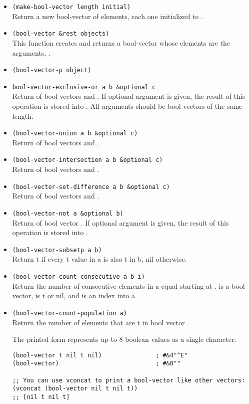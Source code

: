 \begin{itemize}
\item \lstinline|(make-bool-vector length initial)|\\
  Return a new bool-vector of  elements, each one initialized to .
\item \lstinline|(bool-vector &rest objects)|\\
  This function creates and returns a bool-vector whose elements are the arguments, .
\item \lstinline|(bool-vector-p object)|
\item \lstinline|bool-vector-exclusive-or a b &optional c|\\
  Return  of bool vectors  and .
  If optional argument  is given, the result of this operation is stored into .
  All arguments should be bool vectors of the same length.
  
\item \lstinline|(bool-vector-union a b &optional c)|\\
  Return  of bool vectors  and .
\item \lstinline|(bool-vector-intersection a b &optional c)|\\
  Return  of bool vectors  and .
\item \lstinline|(bool-vector-set-difference a b &optional c)|\\
  Return  of bool vectors  and .
\item \lstinline|(bool-vector-not a &optional b)|\\
  Return  of bool vector .
  If optional argument  is given, the result of this operation is stored into .
\item \lstinline|(bool-vector-subsetp a b)|\\
  Return t if every t value in a is also t in b, nil otherwise. 
\item \lstinline|(bool-vector-count-consecutive a b i)|\\
  Return the number of consecutive elements in a equal  starting at .
   is a bool vector,  is t or nil, and  is an index into a.
\item \lstinline|(bool-vector-count-population a)|\\
  Return the number of elements that are t in bool vector .

  The printed form represents up to 8 boolean values as a single character:
\begin{lstlisting}
(bool-vector t nil t nil)               ; #&4"^E"
(bool-vector)                           ; #&0""

;; You can use vconcat to print a bool-vector like other vectors:
(vconcat (bool-vector nil t nil t))
;; [nil t nil t]
\end{lstlisting}


  
\end{itemize}


